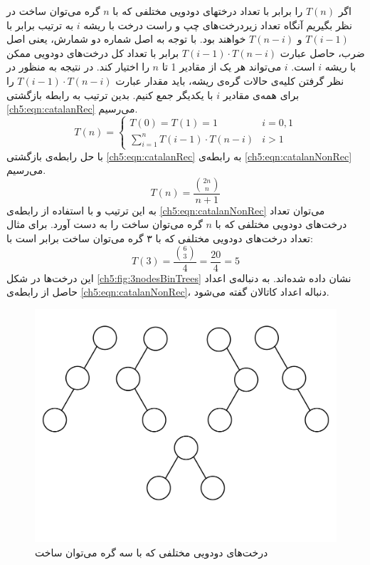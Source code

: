  اگر {$T(n)$} را برابر با تعداد درختهای دودویی مختلفی که با {$n$} گره می‌توان ساخت در نظر بگیریم آنگاه تعداد زیردرخت‌های چپ و راست درخت با ریشه {$i$} به ترتیب برابر با {$T(i-1)$} و {$T(n-i)$} خواهند بود. با توجه به اصل شماره دو شمارش، یعنی اصل ضرب، حاصل عبارت {$T(i-1)\cdot T(n-i)$} برابر با تعداد کل درخت‌های دودویی ممکن با ریشه {$i$} است. {$i$} می‌تواند هر یک از مقادیر 1 تا {$n$} را اختیار کند. در نتیجه به ‌منظور در نظر گرفتن کلیه‌ی حالات گره‌ی ریشه، باید  مقدار عبارت {$T(i-1)\cdot T(n-i)$} را برای همه‌ی مقادیر {$i$} با یکدیگر جمع کنیم. بدین ترتیب به رابطه بازگشتی {\eqref{ch5:eqn:catalanRec}} می‌رسیم.
 \begin{equation}
 T(n)=
 \begin{cases}
 T(0)=T(1)=1 & i=0,1\\
 \sum\limits_{i=1}^{n}{T(i-1)\cdot T(n-i)}& i > 1
 \end{cases}\label{ch5:eqn:catalanRec}
 \end{equation}
با حل رابطه‌ی بازگشتی {\eqref{ch5:eqn:catalanRec}} به رابطه‌ی  {\eqref{ch5:eqn:catalanNonRec}} می‌رسیم.
 \begin{equation}
T(n)=\frac{\displaystyle\binom{2n}{n}}{n+1}\label{ch5:eqn:catalanNonRec}
 \end{equation}
به این ترتیب و با استفاده از رابطه‌ی {\eqref{ch5:eqn:catalanNonRec}} می‌توان تعداد درخت‌های دودویی مختلفی که با {$n$} گره می‌توان ساخت را به دست آورد. برای مثال تعداد درخت‌های دودویی مختلفی که با ۳ گره می‌توان ساخت برابر است با:
\begin{displaymath}
T(3)=\frac{\displaystyle\binom{6}{3}}{4}=\frac{20}{4}=5
\end{displaymath}
این درخت‌ها در شکل {\eqref{ch5:fig:3nodesBinTrees}} نشان داده شده‌اند. به دنباله‌ی اعداد حاصل از رابطه‌ی {\eqref{ch5:eqn:catalanNonRec}}، دنباله اعداد کاتالان گفته می‌شود.

\begin{figure}
\begin{center}
\includegraphics[scale=0.33]{figs/ch5/binary_trees_with_three_nodes.pdf}
\caption{درخت‌های دودویی مختلفی که با سه گره می‌توان ساخت}\label{ch5:fig:3nodesBinTrees}
\end{center}
\end{figure}

